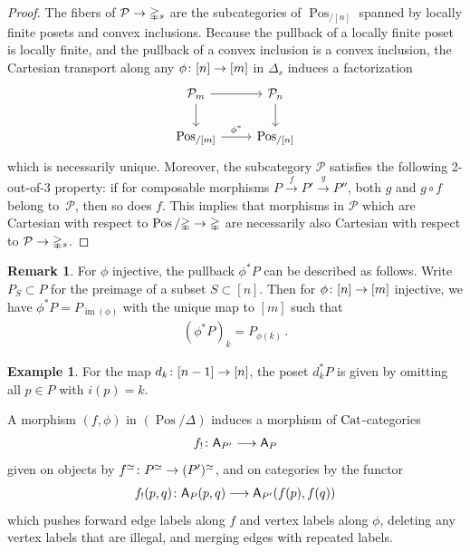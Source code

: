 \documentclass[10pt]{amsart}
\numberwithin{equation}{section}
\theoremstyle{definition}
\newtheorem{ex}[prop]{Example}
\newtheorem{rem}[prop]{Remark}
\DeclareMathOperator{\im}{im}
\DeclareMathOperator{\Pos}{Pos}
\newcommand{\Cat}{\mathrm{Cat}\vphantom{t}}
\newcommand{\Simp}{\mathbb{\Delta}}
\newcommand{\cP}{\mathcal{P}}
\newcommand{\sfA}{\mathsf{A}}
\renewcommand{\to}{\mathchoice{\longrightarrow}{\rightarrow}{}{}}
\begin{document}
\begin{proof}
	The fibers of $\cP \to \Simp_{s}$ are the subcategories of $\Pos_{/[n]}$ spanned by locally finite posets and convex inclusions.
  Because the pullback of a locally finite poset is locally finite, and the pullback of a convex inclusion is a convex inclusion, the Cartesian transport along any $\phi\colon [n]\to [m]$ in $\Simp_{s}$ induces a factorization
	\begin{equation*}
		\begin{tikzcd}
			\cP_{m} \arrow[r] \arrow[d]      &   \cP_{n}  \arrow[d] \\
			\Pos_{/{[m]}}  \arrow[r, "\phi^{*}"]               &   \Pos_{/[n]}
		\end{tikzcd}
	\end{equation*}
	which is necessarily unique.
  Moreover, the subcategory $\cP$ satisfies the following 2-out-of-3 property: if for composable morphisms $P\xrightarrow{f} P' \xrightarrow{g} P''$, both $g$ and $g\circ f$ belong to~$\cP$, then so does $f$.
  This implies that morphisms in $\cP$ which are Cartesian with respect to $\Pos/\Simp \to \Simp$ are necessarily also Cartesian with respect to $\cP \to \Simp_{s}$.
\end{proof}


\begin{rem}\label{rem:P_S}
	For $\phi$ injective, the pullback $\phi^{*}P$ can be described as follows.
	Write $P_{S} \subset P$ for the preimage of a subset $S\subset [n]$.
	Then for $\phi\colon [n] \to [m]$ injective, we have $\phi^{*}P = P_{\im(\phi)}$ with the unique map to $[m]$ such that
	\begin{align*}
		(\phi^{*}P)_{k} = P_{\phi(k)} \,.
	\end{align*}
\end{rem}

\begin{ex}
	For the map $d_k\colon [n-1] \to [n]$, the poset $d_k^{*}P$ is given by omitting all $p\in P$ with $i(p)=k$.
\end{ex}
A morphism $(f,\phi)$ in $(\Pos/\Simp)$ induces a morphism of $\Cat$-categories
\begin{align*}
	f_{!} \colon \sfA_{P'} \to \sfA_{P}
\end{align*}
given on objects by $f^{\simeq} \colon P^{\simeq} \to (P')^{\simeq}$, and on categories by the functor
\begin{align}\label{eq:A_P_functoriality}
	f_{!}(p,q)\colon \sfA_{P}(p,q) \to \sfA_{P'}(f(p), f(q))
\end{align}
which pushes forward edge labels along $f$ and vertex labels along $\phi$, deleting any vertex labels that are illegal, and merging edges with repeated labels.
\end{document}
